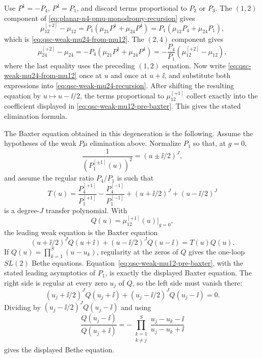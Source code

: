 Use \(P^1=-P_4\), \(P^4=P_1\), and discard terms proportional to \(P_2\)
or \(P_3\).  The \((1,2)\) component of
\eqref{eq:planar-n4-pmu-monodromy-recursion} gives
\[
  \mu_{12}^{[+2]}-\mu_{12}
  =
  P_1(\mu_{21}P^1+\mu_{24}P^4)
  =
  P_1(\mu_{12}P_4+\mu_{24}P_1),
\]
which is \eqref{eq:qsc-weak-mu24-from-mu12}.  The \((2,4)\) component gives
\begin{equation}
  \mu_{24}^{[+2]}-\mu_{24}
  =
  -P_4(\mu_{21}P^1+\mu_{24}P^4)
  =
  -\frac{P_4}{P_1}(\mu_{12}^{[+2]}-\mu_{12}),
  \label{eq:qsc-weak-mu24-recursion}
\end{equation}
where the last equality uses the preceding \((1,2)\) equation.  Now write
\eqref{eq:qsc-weak-mu24-from-mu12} once at \(u\) and once at \(u+\ii\), and
substitute both expressions into
\eqref{eq:qsc-weak-mu24-recursion}.  After shifting the resulting equation by
\(u\mapsto u-\ii/2\), the terms proportional to
\(\mu_{12}^{[+1]}\) collect exactly into the coefficient displayed in
\eqref{eq:qsc-weak-mu12-pre-baxter}.  This gives the stated elimination formula.

The Baxter equation obtained in this degeneration is the following.  Assume
the hypotheses of the weak \(P\mu\) elimination above.  Normalize \(P_1\) so
that, at \(g=0\),
\[
  \frac{1}{(P_1^{[\pm1]}(u))^2}=(u\pm\ii/2)^J,
\]
and assume the regular ratio \(P_4/P_1\) is such that
\[
  T(u)=
    \frac{P_4^{[+1]}}{P_1^{[+1]}}
    -
    \frac{P_4^{[-1]}}{P_1^{[-1]}}
    +(u+\ii/2)^J+(u-\ii/2)^J
\]
is a degree-\(J\) transfer polynomial.  With
\[
  Q(u)=\mu_{12}^{[+1]}(u)\big|_{g=0},
\]
the leading weak equation is the Baxter equation
\[
  (u+\ii/2)^JQ(u+\ii)
  +(u-\ii/2)^JQ(u-\ii)
  =
  T(u)Q(u).
\]
If \(Q(u)=\prod_{k=1}^S(u-u_k)\), regularity at the zeros of \(Q\) gives the
one-loop \(SL(2)\) Bethe equations.
Equation~\eqref{eq:qsc-weak-mu12-pre-baxter}, with the stated leading
asymptotics of \(P_1\), is exactly the displayed Baxter equation.  The right
side is regular at every zero \(u_j\) of \(Q\), so the left side must vanish
there:
\[
  (u_j+\ii/2)^JQ(u_j+\ii)
  +(u_j-\ii/2)^JQ(u_j-\ii)=0.
\]
Dividing by \((u_j-\ii/2)^JQ(u_j-\ii)\) and using
\[
  \frac{Q(u_j-\ii)}{Q(u_j+\ii)}
  =
  -\prod_{\substack{k=1\\k\neq j}}^S
  \frac{u_j-u_k-\ii}{u_j-u_k+\ii}
\]
gives the displayed Bethe equation.

